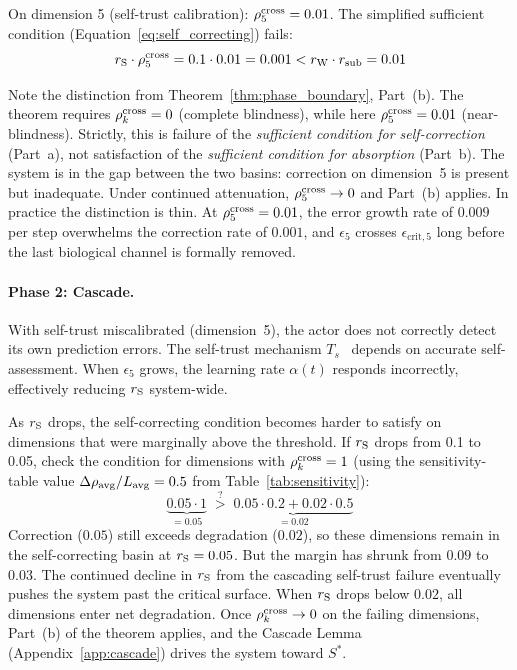 On dimension 5 (self-trust calibration): $\rho^{\mathrm{cross}}_5 = 0.01$.  The
simplified sufficient condition (Equation~\ref{eq:self_correcting})
fails:
\begin{equation*}
r_{\mathrm{S}} \cdot \rho^{\mathrm{cross}}_5 = 0.1 \cdot 0.01 = 0.001
  < r_{\mathrm{W}} \cdot r_{\mathrm{sub}} = 0.01
\end{equation*}

Note the distinction from Theorem~\ref{thm:phase_boundary}, Part~(b).
The theorem requires $\rho^{\mathrm{cross}}_k = 0$ (complete blindness), while
here $\rho^{\mathrm{cross}}_5 = 0.01$ (near-blindness).  Strictly, this is
failure of the \emph{sufficient condition for self-correction}
(Part~a), not satisfaction of the \emph{sufficient condition for
absorption} (Part~b).  The system is in the gap between the two
basins: correction on dimension~5 is present but inadequate.  Under
continued attenuation, $\rho^{\mathrm{cross}}_5 \to 0$ and Part~(b) applies.  In
practice the distinction is thin.  At $\rho^{\mathrm{cross}}_5 = 0.01$, the error
growth rate of $0.009$ per step overwhelms the correction rate of
$0.001$, and $\epsilon_5$ crosses $\epsilon_{\mathrm{crit},5}$ long
before the last biological channel is formally removed.

\paragraph{Phase 2: Cascade.}
With self-trust miscalibrated (dimension~5), the actor does not
correctly detect its own prediction errors.  The self-trust
mechanism $T_s$~\citep{lasser2026gfm} depends on accurate
self-assessment.  When $\epsilon_5$ grows, the learning rate
$\alpha(t)$ responds incorrectly, effectively reducing $r_{\mathrm{S}}$
system-wide.

As $r_{\mathrm{S}}$ drops, the self-correcting condition becomes harder to satisfy
on dimensions that were marginally above the threshold.  If $r_{\mathrm{S}}$ drops
from 0.1 to 0.05, check the condition for dimensions with
$\rho^{\mathrm{cross}}_k = 1$ (using the sensitivity-table value
$\Delta\rho_{\mathrm{avg}} / L_{\mathrm{avg}} = 0.5$ from
Table~\ref{tab:sensitivity}):
\begin{equation*}
\underbrace{0.05 \cdot 1}_{= 0.05}
  \;\stackrel{?}{>}\;
  \underbrace{0.05 \cdot 0.2 + 0.02 \cdot 0.5}_{= 0.02}
\end{equation*}
Correction ($0.05$) still exceeds degradation ($0.02$), so these
dimensions remain in the self-correcting basin at $r_{\mathrm{S}} = 0.05$.  But
the margin has shrunk from $0.09$ to $0.03$.  The continued decline
in $r_{\mathrm{S}}$ from the cascading self-trust failure eventually pushes the
system past the critical surface.  When $r_{\mathrm{S}}$ drops below $0.02$,
all dimensions enter net degradation.  Once $\rho^{\mathrm{cross}}_k \to 0$ on
the failing dimensions, Part~(b) of the theorem applies, and the
Cascade Lemma (Appendix~\ref{app:cascade}) drives the system toward
$S^*$.

